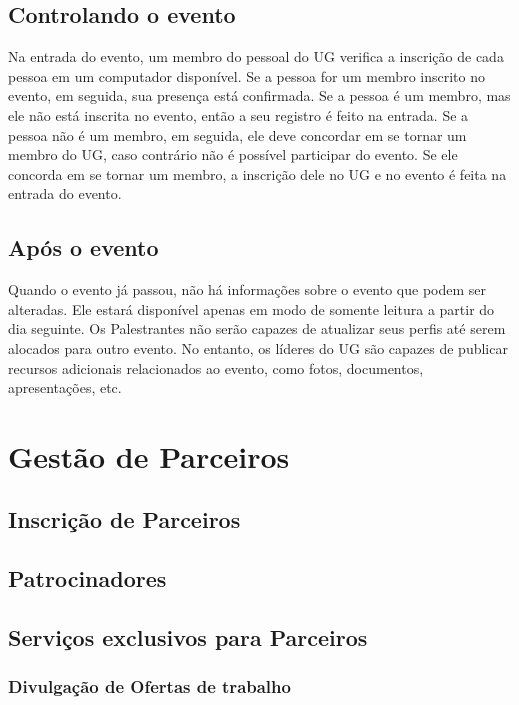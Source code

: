 \documentclass[envcountsame,envcountchap]{svmono}
\begin{document}
\section{Controlando o evento}

Na entrada do evento, um membro do pessoal do UG verifica a inscrição de cada pessoa em um computador disponível. Se a pessoa for um membro inscrito no evento, em seguida, sua presença está confirmada. Se a pessoa é um membro, mas ele não está inscrita no evento, então a seu registro é feito na entrada. Se a pessoa não é um membro, em seguida, ele deve concordar em se tornar um membro do UG, caso contrário não é possível participar do evento. Se ele concorda em se tornar um membro, a inscrição dele no UG e no evento é feita na entrada do evento.

\section{Após o evento}

Quando o evento já passou, não há informações sobre o evento que podem ser alteradas. Ele estará disponível apenas em modo de somente leitura a partir do dia seguinte. Os Palestrantes não serão capazes de atualizar seus perfis até serem alocados para outro evento. No entanto, os líderes do UG são capazes de publicar recursos adicionais relacionados ao evento, como fotos, documentos, apresentações, etc.

\chapter{Gestão de Parceiros}

\section{Inscrição de Parceiros}

\section{Patrocinadores}

\section{Serviços exclusivos para Parceiros}

\subsection{Divulgação de Ofertas de trabalho}
\end{document}
